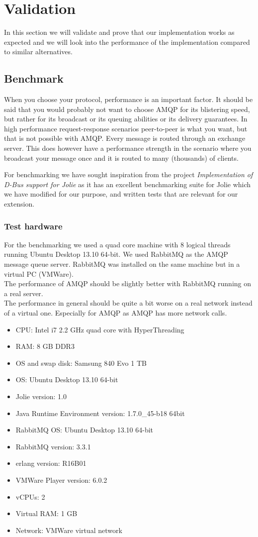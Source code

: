\section{Validation}
In this section we will validate and prove that our implementation works as expected and we will look into the performance of the implementation compared to similar alternatives.
\subsection{Benchmark}
When you choose your protocol, performance is an important factor. It should be said that you would probably not want to choose AMQP for its blistering speed, but rather for its broadcast or its queuing abilities or its delivery guarantees. In high performance request-response scenarios peer-to-peer is what you want, but that is not possible with AMQP. Every message is routed through an exchange server. This does however have a performance strength in the scenario where you broadcast your message once and it is routed to many (thousands) of clients.

For benchmarking we have sought inspiration from the project \textit{Implementation of D-Bus support for Jolie}\cite{D-Bus} as it has an excellent benchmarking suite for Jolie which we have modified for our purpose, and written tests that are relevant for our extension.
\subsubsection{Test hardware}
For the benchmarking we used a quad core machine with 8 logical threads running Ubuntu Desktop 13.10 64-bit. We used RabbitMQ as the AMQP message queue server. RabbitMQ was installed on the same machine but in a virtual PC (VMWare).\\
The performance of AMQP should be slightly better with RabbitMQ running on a real server.\\
The performance in general should be quite a bit worse on a real network instead of a virtual one. Especially for AMQP as AMQP has more network calls.
\begin{itemize}
\item CPU: Intel i7 2.2 GHz quad core with HyperThreading
\item RAM: 8 GB DDR3
\item OS and swap disk: Samsung 840 Evo 1 TB
\item OS: Ubuntu Desktop 13.10 64-bit
\item Jolie version: 1.0
\item Java Runtime Environment version: 1.7.0\_45-b18 64bit
\item RabbitMQ OS: Ubuntu Desktop 13.10 64-bit
\item RabbitMQ version: 3.3.1
\item erlang version: R16B01
\item VMWare Player version: 6.0.2
\item vCPUs: 2
\item Virtual RAM: 1 GB
\item Network: VMWare virtual network
\end{itemize}
